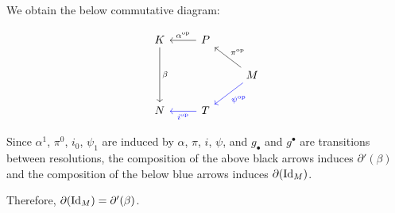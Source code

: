 We obtain the below commutative diagram:

\[\begin{tikzcd}
  K \ar["\beta"]{dd} & \ar[swap, "\alpha^\op"]{l} P &
  \\
  & & M \ar[swap, "\pi^\op"]{lu} \ar[blue, "\psi^\op"]{ld}
  \\
  N & \ar[blue, "i^\op"]{l} T &
\end{tikzcd}\]

Since \(\alpha^1\), \(\pi^0\), \(i_0\), \(\psi_1\)
are induced by \(\alpha\), \(\pi\), \(i\), \(\psi\),
and \(g_\bullet\) and \(g^\bullet\) are transitions between resolutions,
the composition of the above black arrows induces \(\partial'(\beta)\)
and
the composition of the below blue arrows induces \(\partial(\textnormal{Id}_M)\).

Therefore, \(\partial(\textnormal{Id}_M) = \partial'(\beta)\).
\qedsq